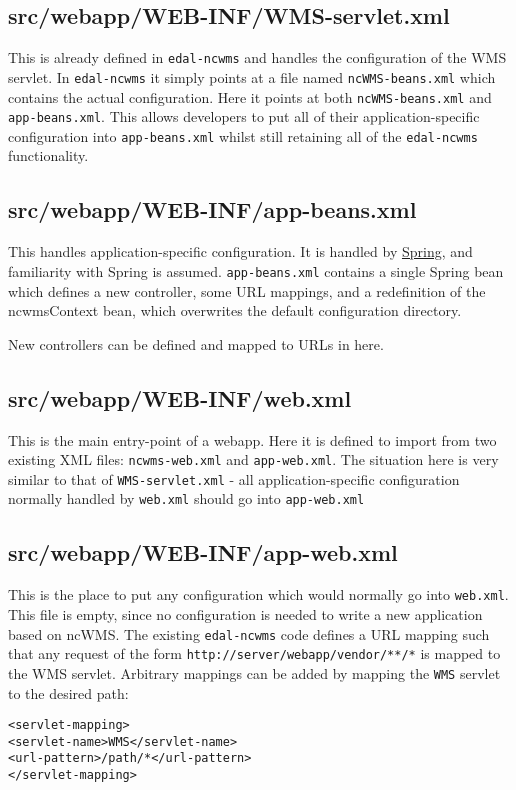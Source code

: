 \documentclass[a4paper]{article}
\begin{document}
\subsection{src/webapp/WEB-INF/WMS-servlet.xml}
This is already defined in {\tt edal-ncwms} and handles the configuration of
the WMS servlet.  In {\tt edal-ncwms} it simply points at a file named
{\tt ncWMS-beans.xml} which contains the actual configuration.  Here it points
at both {\tt ncWMS-beans.xml} and {\tt app-beans.xml}.  This allows developers
to put all of their application-specific configuration into {\tt app-beans.xml}
whilst still retaining all of the {\tt edal-ncwms} functionality.

\subsection{src/webapp/WEB-INF/app-beans.xml}
This handles application-specific configuration.  It is handled by
\href{http://www.springsource.org/}{Spring}, and familiarity with Spring is
assumed.  {\tt app-beans.xml} contains a single Spring bean which defines a
new controller, some URL mappings, and a redefinition of the ncwmsContext bean,
which overwrites the default configuration directory.

New controllers can be defined and mapped to URLs in here.

\subsection{src/webapp/WEB-INF/web.xml}
This is the main entry-point of a webapp.  Here it is defined to import from two
existing XML files: {\tt ncwms-web.xml} and {\tt app-web.xml}.  The situation
here is very similar to that of {\tt WMS-servlet.xml} - all
application-specific configuration normally handled by {\tt web.xml} should go
into {\tt app-web.xml}

\subsection{src/webapp/WEB-INF/app-web.xml}
This is the place to put any configuration which would normally go into
{\tt web.xml}.  This file is empty, since no configuration is needed to write a
new application based on ncWMS.  The existing {\tt edal-ncwms} code defines a
URL mapping such that any request of the form
{\tt http://server/webapp/vendor/**/*} is mapped to the WMS servlet.  Arbitrary
mappings can be added by mapping the {\tt WMS} servlet to the desired path: 
\begin{alltt}
<servlet-mapping>
    <servlet-name>WMS</servlet-name>
    <url-pattern>/path/*</url-pattern>
</servlet-mapping>
\end{alltt}
\end{document}
